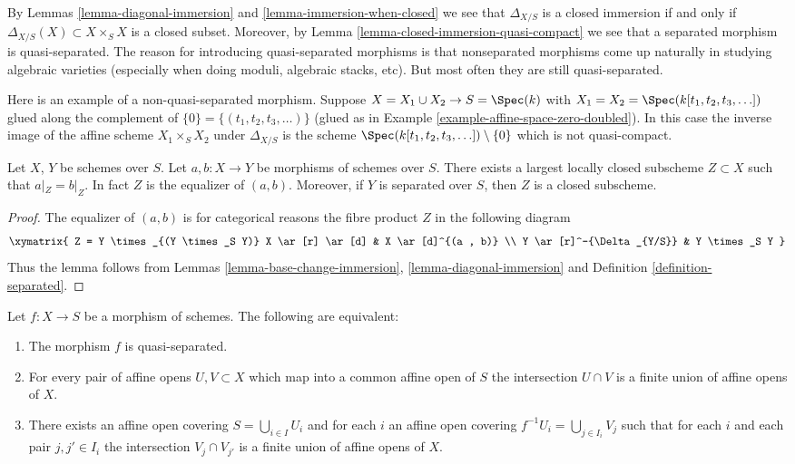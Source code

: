 \noindent
By Lemmas \ref{lemma-diagonal-immersion} and \ref{lemma-immersion-when-closed}
we see that $\Delta_{X/S}$ is a closed immersion if and only if
$\Delta_{X/S}(X) \subset X \times_S X$ is a closed subset. Moreover,
by Lemma \ref{lemma-closed-immersion-quasi-compact} we see that a
separated morphism is quasi-separated. The reason for introducing
quasi-separated morphisms is that nonseparated morphisms come up naturally
in studying algebraic varieties (especially when doing moduli,
algebraic stacks, etc). But most often they are still quasi-separated.

\begin{example}
\label{example-not-quasi-separated}
Here is an example of a non-quasi-separated morphism.
Suppose $X = X_1 \cup X_2 \to S = \Spec(k)$ with
$X_1 = X_2 = \Spec(k[t_1, t_2, t_3, \ldots])$
glued along the complement of $\{0\} = \{(t_1, t_2, t_3, \ldots)\}$
(glued as in Example \ref{example-affine-space-zero-doubled}).
In this case the inverse image of the affine scheme
$X_1 \times_S X_2$ under $\Delta_{X/S}$ is the scheme
$\Spec(k[t_1, t_2, t_3, \ldots]) \setminus \{0\}$
which is not quasi-compact.
\end{example}

\begin{lemma}
\label{lemma-where-are-they-equal}
Let $X$, $Y$ be schemes over $S$.
Let $a, b : X \to Y$ be morphisms of schemes over $S$.
There exists a largest locally closed subscheme
$Z \subset X$ such that $a|_Z = b|_Z$. In fact $Z$ is
the equalizer of $(a, b)$. Moreover, if $Y$ is separated
over $S$, then $Z$ is a closed subscheme.
\end{lemma}

\begin{proof}
The equalizer of $(a, b)$ is for categorical reasons
the fibre product $Z$ in the following diagram
$$
\xymatrix{
Z = Y \times_{(Y \times_S Y)} X \ar[r] \ar[d] &
 X \ar[d]^{(a , b)} \\
Y \ar[r]^-{\Delta_{Y/S}} & Y \times_S Y
}
$$
Thus the lemma follows from Lemmas
\ref{lemma-base-change-immersion}, \ref{lemma-diagonal-immersion} and
Definition \ref{definition-separated}.
\end{proof}

\begin{lemma}
\label{lemma-characterize-quasi-separated}
Let $f : X \to S$ be a morphism of schemes.
The following are equivalent:
\begin{enumerate}
\item The morphism $f$ is quasi-separated.
\item For every pair of affine opens $U, V \subset X$
which map into a common affine open of $S$ the intersection
$U \cap V$ is a finite union of affine opens of $X$.
\item There exists an affine open covering $S = \bigcup_{i \in I} U_i$
and for each $i$ an affine open covering $f^{-1}U_i = \bigcup_{j \in I_i} V_j$
such that for each $i$ and each pair $j, j' \in I_i$ the
intersection $V_j \cap V_{j'}$ is a finite union of affine
opens of $X$.
\end{enumerate}
\end{lemma}

